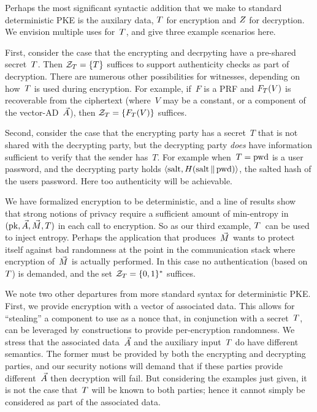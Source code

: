 Perhaps the most significant syntactic addition that we make to standard deterministic PKE is the auxilary data, $T$ for encryption and $Z$ for decryption.  We envision multiple uses for~$T$, and give three example scenarios here.

First, consider the case that the encrypting and decrpyting have a pre-shared secret~$T$.  Then $\mathcal{Z}_T=\{T\}$ suffices to support authenticity checks as part of decryption.  There are numerous other possibilities for witnesses, depending on how~$T$ is used during encryption.  For example, if~$F$ is a PRF and $F_T(V)$ is recoverable from the ciphertext (where~$V$ may be a constant, or a component of the vector-AD~$\vec{A}$), then $\mathcal{Z}_T=\{F_T(V)\}$ suffices.  

Second, consider the case that the encrypting party has a secret~$T$ that is not shared with the decrypting party, but the decrypting party \emph{does} have information sufficient to verify that the sender has~$T$.  For example when~$T=\mathrm{pwd}$ is a user password, and the decrypting party holds $\langle \mathrm{salt},H(\mathrm{salt} \,\|\, \mathrm{pwd})\rangle$, the salted hash of the users password.  Here too authenticity will be achievable.

We have formalized encryption to be deterministic, and a line of results \cite{xxx,yyy,zzz} show that strong notions of privacy require a sufficient amount of min-entropy in $(\mathrm{pk},\vec{A},\vec{M},T)$ in each call to encryption.  
So as our third example, $T$~can be used to inject entropy.  
Perhaps the application that produces~$\vec{M}$ wants to protect itself against bad randomness at the point in the communication stack where encryption of~$\vec{M}$ is actually performed.  In this case no authentication (based on~$T$) is demanded, and the set $\mathcal{Z}_T=\{0,1\}^*$ suffices.

We note two other departures from more standard syntax for deterministic PKE.  First, we provide encryption with a vector of associated data.  This allows for ``stealing'' a component to use as a nonce that, in conjunction with a secret~$T$, can be leveraged by constructions to provide per-encryption randomness.  We stress that the associated data~$\vec{A}$ and the auxiliary input~$T$ do have different semantics.  The former must be provided by both the encrypting and decrypting parties, and our security notions will demand that if these parties provide different~$\vec{A}$ then decryption will fail.  But considering the examples just given, it is not the case that~$T$ will be known to both parties; hence it cannot simply be considered as part of the associated data.

